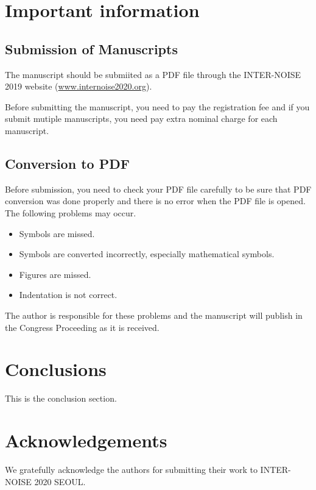 \documentclass[a4paper,12pt]{article}
\begin{document}
\section{Important information}

\subsection{Submission of Manuscripts}

The manuscript should be submiited as a PDF file through the INTER-NOISE 2019 website
(\url{www.internoise2020.org}). \par
Before submitting the manuscript, you need to pay the registration fee and if you submit mutiple manuscripts, you need pay extra nominal charge for each manuscript.


\subsection{Conversion to PDF}

Before submission, you need to check your PDF file carefully to be sure that PDF conversion was
done properly and there is no error when the PDF file is opened. 
The following problems may occur.

\begin{itemize}
\item Symbols are missed.
\item Symbols are converted incorrectly, especially mathematical symbols.
\item Figures are missed.
\item Indentation is not correct.
\end{itemize}

The author is responsible for these problems and the manuscript will publish in the Congress Proceeding as it is received.

\section{Conclusions}
This is the conclusion section.

\section{Acknowledgements}
We  gratefully acknowledge the authors for submitting their work to INTER-NOISE 2020 SEOUL.



 

\end{document}
